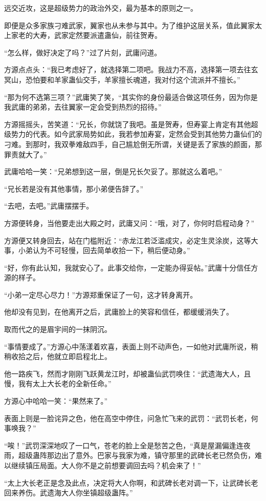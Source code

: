 \begin{this_body}
远交近攻，这是超级势力的政治外交，最为基本的原则之一。

即便是众多家族刁难武家，翼家也从未参与其中。为了维护这层关系，值此翼家太上家老的大寿，武家定然要派遣蛊仙，前往贺寿。

“怎么样，做好决定了吗？”过了片刻，武庸问道。

方源点点头：“我已考虑好了，就选择第二项吧。我战力不高，选择第一项去往玄冥山，恐怕要和羊家蛊仙交手，羊家擅长魂道，我对付这个流派并不擅长。”

“那为何不选第三项？”武庸笑了笑，“其实你的身份最适合做这项任务，因为你是我武庸的弟弟，去往翼家一定会受到热烈的招待。”

方源摇摇头，苦笑道：“兄长，你就饶了我吧。虽是贺寿，但寿宴上肯定有其他超级势力的代表。如今武家局势如此，我若参加寿宴，定然会受到其他势力蛊仙们的刁难。到那时，我双拳难敌四手，自己尴尬倒无所谓，关键是丢了家族的颜面，那罪责就大了。”

武庸哈哈一笑：“兄弟想到这一层，倒是兄长欠妥了。那就这么着吧。”

“兄长若是没有其他事情，那小弟便告辞了。”

“去吧，去吧。”武庸摆摆手。

方源便转身，当他要走出大殿之时，武庸又问：“哦，对了，你何时启程动身？”

方源便又转身回去，站在门槛附近：“赤龙江若泛滥成灾，必定生灵涂炭，这等大事，小弟认为不可轻慢，回去简单收拾一下，稍后便动身。”

“好，你有此认知，我就安心了。此事交给你，一定能办得妥帖。”武庸十分信任方源的样子。

“小弟一定尽心尽力！”方源郑重保证了一句，这才转身离开。

他却没有见到，在他离开之后，武庸脸上的笑容和信任，都缓缓消失了。

取而代之的是眉宇间的一抹阴沉。

“事情要成了。”方源心中荡漾着欢喜，表面上则不动声色，一如他对武庸所说，稍稍收拾之后，他就立即启程北上。

他一路疾飞，然而才刚刚飞跃黄龙江时，却被蛊仙武罚唤住：“武遗海大人，且慢，我有太上大长老的全新任命。”

方源心中哈哈一笑：“果然来了。”

表面上则是一脸诧异之色，他在高空中停住，问急忙飞来的武罚：“武罚长老，何事唤我？”

“唉！”武罚深深地叹了一口气，苍老的脸上全是愁苦之色，“真是屋漏偏逢连夜雨，超级蛊阵那边出了意外。巴家与我家为难，镇守那里的武碑长老已然负伤，难以继续镇压局面。大人你不是之前想要调回去吗？机会来了！”

“太上大长老正是念及此点，决定将大人你啊，和武碑长老对调一下，让武碑长老回来养伤。武遗海大人你坐镇超级蛊阵。”


\end{this_body}
